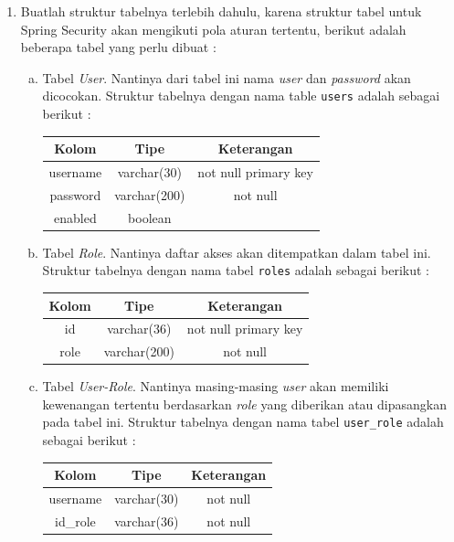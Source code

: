 \begin{enumerate}
	\item Buatlah struktur tabelnya terlebih dahulu, karena struktur tabel untuk Spring Security akan mengikuti pola aturan tertentu, berikut adalah beberapa tabel yang perlu dibuat :
	\begin{enumerate}[a.]
		\item Tabel \textit{User}. Nantinya dari tabel ini nama \textit{user} dan \textit{password} akan dicocokan. Struktur tabelnya dengan nama table \texttt{users} adalah sebagai berikut :
		
\begin{tabular}{| c | c | c |}
\hline
Kolom & Tipe & Keterangan \\
\hline
\hline
username & varchar(30) & not null primary key \\
\hline
password & varchar(200) & not null \\
\hline
enabled & boolean & \\
\hline
\end{tabular}		
		
		\item Tabel \textit{Role}. Nantinya daftar akses akan ditempatkan dalam tabel ini. Struktur tabelnya dengan nama tabel \texttt{roles} adalah sebagai berikut :
		
\begin{tabular}{| c | c | c |}
\hline
Kolom & Tipe & Keterangan \\
\hline
\hline
id & varchar(36) & not null primary key \\
\hline
role & varchar(200) & not null \\
\hline
\end{tabular}
		
		\item Tabel \textit{User-Role}. Nantinya masing-masing \textit{user} akan memiliki kewenangan tertentu berdasarkan \textit{role} yang diberikan atau dipasangkan pada tabel ini. Struktur tabelnya dengan nama tabel \texttt{user\_role} adalah sebagai berikut :
		
\begin{tabular}{| c | c | c |}
\hline
Kolom & Tipe & Keterangan \\
\hline
\hline
username & varchar(30) & not null \\
\hline
id\_role & varchar(36) & not null \\
\hline
\end{tabular}		
	\end{enumerate}
	

\end{enumerate}

